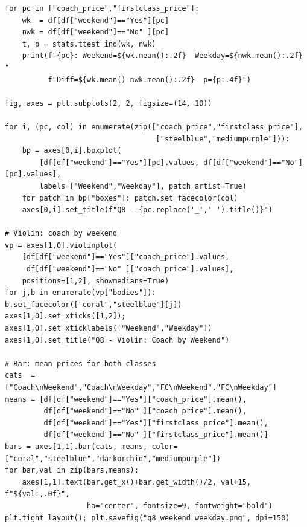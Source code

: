\documentclass[12pt, a4paper]{report}
\begin{document}
\begin{lstlisting}[style=python, caption={Python — Weekend vs.\ weekday t-tests and visualisations}]
for pc in ["coach_price","firstclass_price"]:
    wk  = df[df["weekend"]=="Yes"][pc]
    nwk = df[df["weekend"]=="No" ][pc]
    t, p = stats.ttest_ind(wk, nwk)
    print(f"{pc}: Weekend=${wk.mean():.2f}  Weekday=${nwk.mean():.2f}  "
          f"Diff=${wk.mean()-nwk.mean():.2f}  p={p:.4f}")

fig, axes = plt.subplots(2, 2, figsize=(14, 10))

for i, (pc, col) in enumerate(zip(["coach_price","firstclass_price"],
                                   ["steelblue","mediumpurple"])):
    bp = axes[0,i].boxplot(
        [df[df["weekend"]=="Yes"][pc].values, df[df["weekend"]=="No"][pc].values],
        labels=["Weekend","Weekday"], patch_artist=True)
    for patch in bp["boxes"]: patch.set_facecolor(col)
    axes[0,i].set_title(f"Q8 - {pc.replace('_',' ').title()}")

# Violin: coach by weekend
vp = axes[1,0].violinplot(
    [df[df["weekend"]=="Yes"]["coach_price"].values,
     df[df["weekend"]=="No" ]["coach_price"].values],
    positions=[1,2], showmedians=True)
for j,b in enumerate(vp["bodies"]): b.set_facecolor(["coral","steelblue"][j])
axes[1,0].set_xticks([1,2]); axes[1,0].set_xticklabels(["Weekend","Weekday"])
axes[1,0].set_title("Q8 - Violin: Coach by Weekend")

# Bar: mean prices for both classes
cats  = ["Coach\nWeekend","Coach\nWeekday","FC\nWeekend","FC\nWeekday"]
means = [df[df["weekend"]=="Yes"]["coach_price"].mean(),
         df[df["weekend"]=="No" ]["coach_price"].mean(),
         df[df["weekend"]=="Yes"]["firstclass_price"].mean(),
         df[df["weekend"]=="No" ]["firstclass_price"].mean()]
bars = axes[1,1].bar(cats, means, color=["coral","steelblue","darkorchid","mediumpurple"])
for bar,val in zip(bars,means):
    axes[1,1].text(bar.get_x()+bar.get_width()/2, val+15, f"${val:,.0f}",
                   ha="center", fontsize=9, fontweight="bold")
plt.tight_layout(); plt.savefig("q8_weekend_weekday.png", dpi=150)
\end{lstlisting}
\end{document}
